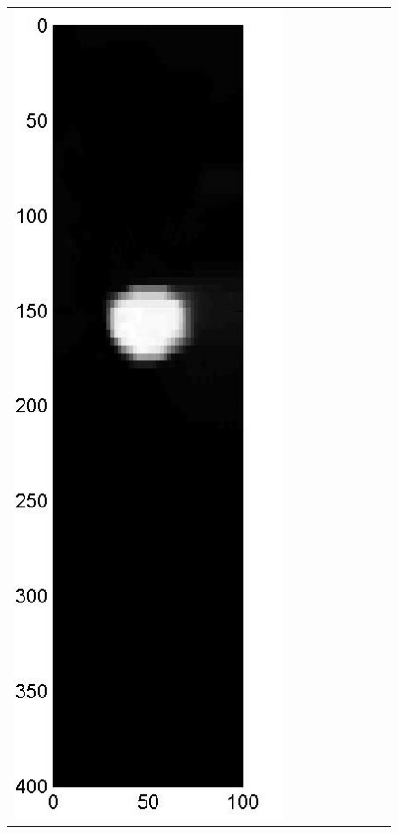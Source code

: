 \documentclass[11pt]{article}
\begin{document}
\begin{figure}[!h]
\begin{center}
\begin{tabular}{|c|c|c|c|c|c|c|c|c|}
			\includegraphics[width=.9\iwidth]{figures/newFigs/noisy/resultsExp-3-mkTV}
			&

\end{tabular}
\end{center}
\end{figure}
\end{document}
